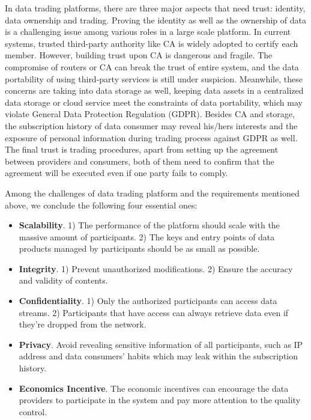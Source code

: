 \documentclass[conference]{IEEEtran}
\begin{document}
In data trading platforms, there are three major aspects that need trust: identity, data ownership and trading. Proving the identity as well as the ownership of data is a challenging issue among various roles in a large scale platform. In current systems, trusted third-party authority like CA is widely adopted to certify each member. However, building trust upon CA is dangerous and fragile. The compromise of routers or CA can break the trust of entire system, and the data portability of using third-party services is still under suspicion. Meanwhile, these concerns are taking into data storage as well, keeping data assets in a centralized data storage or cloud service meet the constraints of data portability, which may violate General Data Protection Regulation (GDPR)\cite{GDPR}. Besides CA and storage, the subscription history of data consumer may reveal his/hers interests and the exposure of personal information during trading process against GDPR as well. The final trust is trading procedures, apart from setting up the agreement between providers and consumers, both of them need to confirm that the agreement will be executed even if one party fails to comply.

Among the challenges of data trading platform\cite{BigDataMarket} and the requirements mentioned above, we conclude the following four essential ones:
\begin{itemize}
	\item \textbf{Scalability}. 
1) The performance of the platform should scale with the massive amount of participants. 2) The keys and entry points of data products managed by participants should be as small as possible. 
	\item \textbf{Integrity}. 1) Prevent unauthorized modifications. 2) Ensure the accuracy and validity of contents.	
	\item \textbf{Confidentiality}. 
1) Only the authorized participants can access data streams. 2) Participants that have access can always retrieve data even if they're dropped from the network.	
	\item \textbf{Privacy}. Avoid revealing sensitive information of all participants, such as IP address and data consumers' habits which may leak within the subscription history.
	\item \textbf{Economics Incentive}. The economic incentives can encourage the data providers to participate in the system and pay more attention to the quality control. 
\end{itemize}
\end{document}
